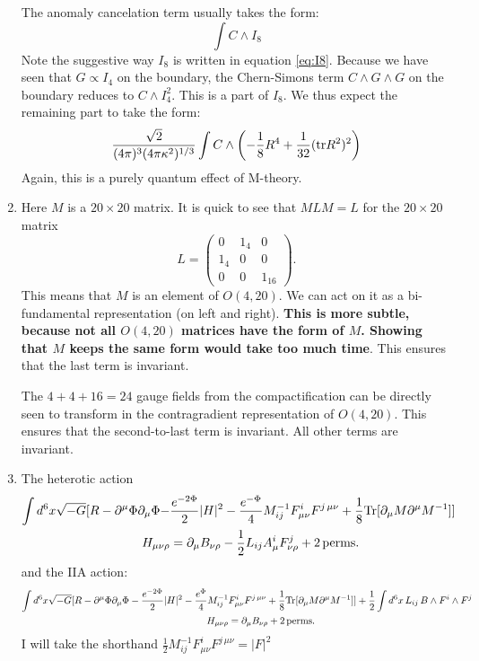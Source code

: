 \documentclass[11pt, class=article, crop=false]{standalone}
\begin{document}
\begin{enumerate}
	 The anomaly cancelation term usually takes the form:
	 \[
	 	\int C \wedge I_8
	 \]
	 Note the suggestive way $I_8$ is written in equation \eqref{eq:I8}.
	Because we have seen that $G \propto I_4$ on the boundary, the Chern-Simons term $C \wedge G \wedge G$ on the boundary reduces to $C \wedge I_4^2$. This is a part of $I_8$. We thus expect the remaining part to take the form:
	\[
		\frac{\sqrt{2}}{(4 \pi)^3 (4 \pi \kappa^2)^{1/3}} \int C \wedge \left(-\frac18 R^4 + \frac{1}{32} (\mathrm{tr} R^2)^2 \right)
	\]
	Again, this is a purely quantum effect of M-theory. 
	
	\item Here $M$ is a $20 \times 20$ matrix. It is quick to see that $M L M = L$ for the $20 \times 20$ matrix 
	\[
		L = \begin{pmatrix}
			0 & 1_4 & 0\\
			1_4 & 0 & 0\\
			0 & 0 & 1_{16}
		\end{pmatrix}.
	\]
	This means that $M$ is an element of $O(4,20)$. We can act on it as a bi-fundamental representation (on left and right). \textbf{This is more subtle, because not all $O(4, 20)$ matrices have the form of $M$. Showing that $M$ keeps the same form would take too much time}.  This ensures that the last term is invariant.
	
	The $4+4+16 = 24$ gauge fields from the compactification can be directly seen to transform in the contragradient representation of $O(4,20)$. This ensures that the second-to-last term is invariant. All other terms are invariant.
	
	\item The heterotic action
	\[
	\begin{aligned}
		\int d^6 x \sqrt{-G} [R - \partial^\mu \Phi \partial_\mu \Phi - &\frac{e^{-2 \Phi}}{2} |H|^2 - \frac{e^{-\Phi}}{4} M^{-1}_{ij} F^i_{\mu \nu} F^{j\, \mu \nu} + \frac18 \mathrm{Tr}[\partial_\mu M \partial^\mu M^{-1}]]\\
		 H_{\mu \nu \rho} &= \partial_\mu B_{\nu \rho} - \frac12 L_{ij} A^i_\mu F^j_{\nu \rho} + 2 \,\mathrm{perms.}
	\end{aligned}
	\]
	and the IIA action:
	\[
	\begin{aligned}
		\int d^6 x \sqrt{-G} [R - \partial^\mu \Phi \partial_\mu \Phi - \frac{e^{-2 \Phi}}{2} |H|^2 - \frac{e^{\Phi}}{4} M^{-1}_{ij}& F^i_{\mu \nu} F^{j\, \mu \nu} + \frac18 \mathrm{Tr}[\partial_\mu M \partial^\mu M^{-1}]] + \frac12 \int d^6 x \, L_{ij}\, B \wedge F^i \wedge F^j
		 \\
		 \quad H_{\mu \nu \rho} &= \partial_\mu B_{\nu \rho} + 2 \,\mathrm{perms.}
	\end{aligned}
	\]
	I will take the shorthand $\frac12 M^{-1}_{ij} F^i_{\mu \nu} F^{j\, \mu \nu} = |F|^2$
	

\end{enumerate}
\end{document}

